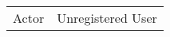 \begin{table}[]
\begin{tabular}{ll}
Actor            & Unregistered User                                                                                                                                                                                                                                                                                                                                                                                                                                                                                                                                                                                                                                                                                                                                                                                                                                                                                                                                                                                                                                                                                                                                                                                                                                                                                                                                                                                                                                                                                                                                                                                                                                                                                                                                                                                                                                                                                                                                                                                                                                                   \\

\end{tabular}
\end{table}
